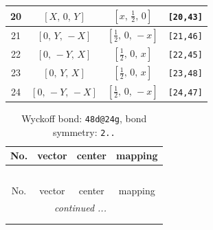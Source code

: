 \documentclass[fleqn,8pt]{jsarticle}
\begin{document}
\begin{longtable}{cccc}
20 & $\left[ X,\, 0,\, Y \right]$ & $\left[ x,\, \frac{1}{2},\, 0 \right]$ & {\tt [20,43]} \\ \hline
21 & $\left[ 0,\, Y,\, - X \right]$ & $\left[ \frac{1}{2},\, 0,\, - x \right]$ & {\tt [21,46]} \\ \hline
22 & $\left[ 0,\, - Y,\, X \right]$ & $\left[ \frac{1}{2},\, 0,\, x \right]$ & {\tt [22,45]} \\ \hline
23 & $\left[ 0,\, Y,\, X \right]$ & $\left[ \frac{1}{2},\, 0,\, x \right]$ & {\tt [23,48]} \\ \hline
24 & $\left[ 0,\, - Y,\, - X \right]$ & $\left[ \frac{1}{2},\, 0,\, - x \right]$ & {\tt [24,47]} \\
\end{longtable}
\renewcommand{\arraystretch}{1.2}
\begin{longtable}{cccc}
\caption{Wyckoff bond: {\tt 48d@24g}, bond symmetry: {\tt 2..}}
 \\
 \hline \hline
No. & vector & center & mapping \\ \hline \endfirsthead

\multicolumn{3}{l}{\tablename\ \thetable{}} \\
 \hline \hline
No. & vector & center & mapping \\ \hline \endhead

 \hline \hline
\multicolumn{3}{r}{\footnotesize\it continued ...} \\ \endfoot

 \hline \hline
\multicolumn{3}{r}{} \\ \endlastfoot


\end{longtable}
\end{document}

